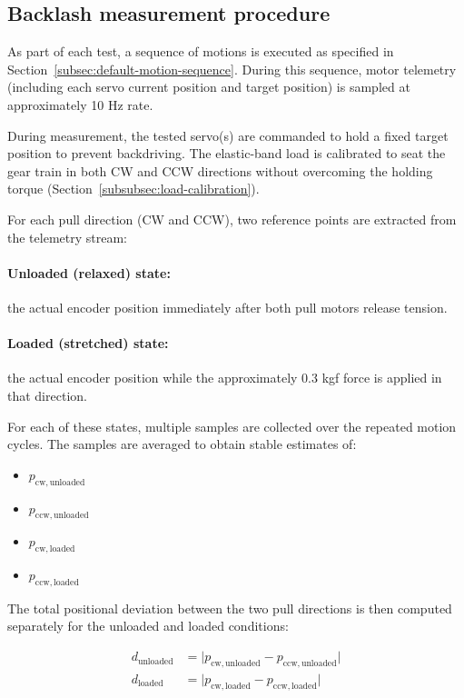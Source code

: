 \documentclass[11pt,letterpaper]{article}
\begin{document}
\subsection{Backlash measurement procedure}
\label{subsec:backlash-procedure}

As part of each test, a sequence of motions is executed as specified in Section~\ref{subsec:default-motion-sequence}. During this sequence, motor telemetry (including each servo current position and target position)  is sampled at approximately 10 Hz rate.

During measurement, the tested servo(s) are commanded to hold a fixed target position to prevent backdriving. The elastic-band load is calibrated to seat the gear train in both CW and CCW directions without overcoming the holding torque (Section~\ref{subsubsec:load-calibration}).

For each pull direction (CW and CCW), two reference points are extracted from the telemetry stream:

\paragraph{Unloaded (relaxed) state:} the actual encoder position immediately after both pull motors release tension.
\paragraph{Loaded (stretched) state:} the actual encoder position while the approximately 0.3 kgf force is applied in that direction.

For each of these states, multiple samples are collected over the repeated motion cycles. The samples are averaged to obtain stable estimates of:

\begin{itemize}
    \item $p_{\mathrm{cw,unloaded}}$
    \item $p_{\mathrm{ccw,unloaded}}$
    \item $p_{\mathrm{cw,loaded}}$
    \item $p_{\mathrm{ccw,loaded}}$
\end{itemize}

The total positional deviation between the two pull directions is then computed separately for the unloaded and loaded conditions:


\begin{align}
    d_{\mathrm{unloaded}} &= \bigl| p_{\mathrm{cw,unloaded}} - p_{\mathrm{ccw,unloaded}} \bigr| \\
    d_{\mathrm{loaded}} &= \bigl| p_{\mathrm{cw,loaded}} - p_{\mathrm{ccw,loaded}} \bigr|
\end{align}
\end{document}
